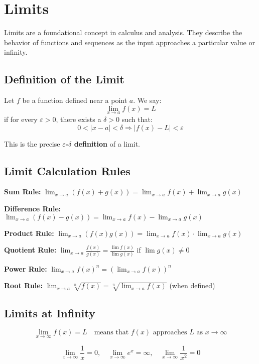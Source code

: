 \section{Limits}

Limits are a foundational concept in calculus and analysis. They describe the behavior of functions and sequences as the input approaches a particular value or infinity.

\subsection{Definition of the Limit}

Let \(f\) be a function defined near a point \(a\). We say:
\[
\lim_{x \to a} f(x) = L
\]
if for every \(\varepsilon > 0\), there exists a \(\delta > 0\) such that:
\[
0 < |x - a| < \delta \Rightarrow |f(x) - L| < \varepsilon
\]

This is the precise \textbf{\(\varepsilon\)-\(\delta\) definition} of a limit.

\subsection{Limit Calculation Rules}

\textbf{Sum Rule:} \(\displaystyle \lim_{x \to a} (f(x) + g(x)) = \lim_{x \to a} f(x) + \lim_{x \to a} g(x)\)

\textbf{Difference Rule:} \(\displaystyle \lim_{x \to a} (f(x) - g(x)) = \lim_{x \to a} f(x) - \lim_{x \to a} g(x)\)

\textbf{Product Rule:} \(\displaystyle \lim_{x \to a} (f(x)g(x)) = \lim_{x \to a} f(x) \cdot \lim_{x \to a} g(x)\)

\textbf{Quotient Rule:} \(\displaystyle \lim_{x \to a} \frac{f(x)}{g(x)} = \frac{\lim f(x)}{\lim g(x)}\) if \(\lim g(x) \ne 0\)

\textbf{Power Rule:} \(\displaystyle \lim_{x \to a} f(x)^n = (\lim_{x \to a} f(x))^n\)

\textbf{Root Rule:} \(\displaystyle \lim_{x \to a} \sqrt[n]{f(x)} = \sqrt[n]{\lim_{x \to a} f(x)}\) (when defined)

\subsection{Limits at Infinity}

\[
\lim_{x \to \infty} f(x) = L \quad \text{means that } f(x) \text{ approaches } L \text{ as } x \to \infty
\]

\[
\lim_{x \to \infty} \frac{1}{x} = 0, \quad \lim_{x \to \infty} e^x = \infty, \quad \lim_{x \to \infty} \frac{1}{x^2} = 0
\]

